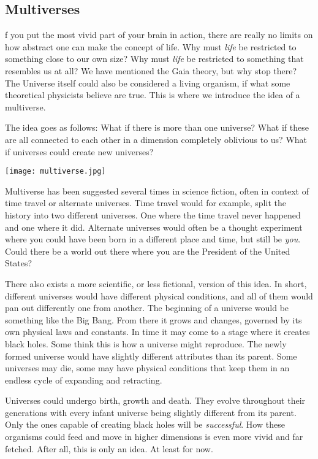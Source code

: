 \subsection{Multiverses}
f you put the most vivid part of your brain in action, there are really no limits on how abstract one can make the concept of life.
Why must \textit{life} be restricted to something close to our own size?
Why must \textit{life} be restricted to something that resembles us at all?
We have mentioned the Gaia theory, but why stop there?
The Universe itself could also be considered a living organism, if what some theoretical physicists believe are true.
This is where we introduce the idea of a multiverse.

The idea goes as follows:
What if there is more than one universe?
What if these are all connected to each other in a dimension completely oblivious to us?
What if universes could create new universes?

\begin{center}
	\texttt{[image: multiverse.jpg]}
\end{center}

Multiverse has been suggested several times in science fiction, often in context of time travel or alternate universes.
Time travel would for example, split the history into two different universes.
One where the time travel never happened and one where it did.
Alternate universes would often be a thought experiment where you could have been born in a different place and time, but still be \textit{you}.
Could there be a world out there where you are the President of the United States?

There also exists a more scientific, or less fictional, version of this idea.
In short, different universes would have different physical conditions, and all of them would pan out differently one from another.
The beginning of a universe would be something like the Big Bang.
From there it grows and changes, governed by its own physical laws and constants.
In time it may come to a stage where it creates black holes.
Some think this is how a universe might reproduce.
The newly formed universe would have slightly different attributes than its parent.
Some universes may die, some may have physical conditions that keep them in an endless cycle of expanding and retracting.

Universes could undergo birth, growth and death.
They evolve throughout their generations with every infant universe being slightly different from its parent.
Only the ones capable of creating black holes will be \textit{successful}.
How these organisms could feed and move in higher dimensions is even more vivid and far fetched.
After all, this is only an idea.
At least for now.
